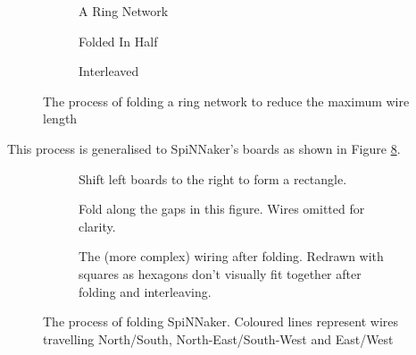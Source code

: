 			\begin{figure}
				\begin{subfigure}[b]{\textwidth}
					\center
					
					\caption{A Ring Network}
					\label{fig:ringLong}
				\end{subfigure}
				
				\vspace{2ex}
				
				\begin{subfigure}[b]{\textwidth}
					\center
					
					\caption{Folded In Half}
					\label{fig:ringFolded}
				\end{subfigure}
				
				\vspace{2ex}
				
				\begin{subfigure}[b]{\textwidth}
					\center
					
					\caption{Interleaved}
					\label{fig:ringInterleaved}
				\end{subfigure}
				
				\caption[Folding a ring network to reduce the maximum wire length]{The
				process of folding a ring network to reduce the maximum wire length}
				\label{fig:folding}
			\end{figure}
			
			This process is generalised to SpiNNaker's boards as shown in Figure
			\ref{fig:boardsFolded}.
			
			\begin{figure}
				\center
				\begin{subfigure}[b]{\textwidth}
					\center
					
					\caption{Shift left boards to the right to form a rectangle.}
					\label{fig:boardsFoldedShift}
				\end{subfigure}
				
				\vspace{2ex}
				
				\begin{subfigure}[b]{\textwidth}
					\center
					
					\caption{Fold along the gaps in this figure. Wires omitted for
					clarity.}
					\label{fig:boardsFoldedSpaced}
				\end{subfigure}
				
				\vspace{2ex}
				
				\begin{subfigure}[b]{\textwidth}
					\center
					
					\caption{The (more complex) wiring after folding. Redrawn with squares
					as hexagons don't visually fit together after folding and
					interleaving.}
					\label{fig:boardsFoldedInterleaved}
				\end{subfigure}
				
				\caption[Folding SpiNNaker]{The process of folding SpiNNaker. Coloured
				lines represent wires travelling {\color{red}North/South},
				{\color{green}North-East/South-West} and {\color{blue}East/West}}
				\label{fig:boardsFolded}
			\end{figure}
			

